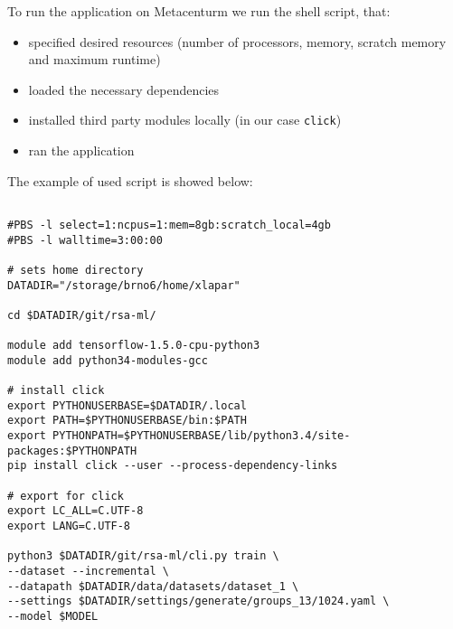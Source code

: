 To run the application on Metacenturm we run the shell script, that:

\begin{itemize}

\item specified desired resources (number of processors, memory, scratch memory and maximum runtime)

\item loaded the necessary dependencies

\item installed third party modules locally (in our case \texttt{click})

\item ran the application

\end{itemize}

\noindent
The example of used script is showed below:

\begin{verbatim}

#PBS -l select=1:ncpus=1:mem=8gb:scratch_local=4gb
#PBS -l walltime=3:00:00

# sets home directory
DATADIR="/storage/brno6/home/xlapar"

cd $DATADIR/git/rsa-ml/

module add tensorflow-1.5.0-cpu-python3
module add python34-modules-gcc

# install click
export PYTHONUSERBASE=$DATADIR/.local
export PATH=$PYTHONUSERBASE/bin:$PATH
export PYTHONPATH=$PYTHONUSERBASE/lib/python3.4/site-packages:$PYTHONPATH
pip install click --user --process-dependency-links

# export for click
export LC_ALL=C.UTF-8
export LANG=C.UTF-8

python3 $DATADIR/git/rsa-ml/cli.py train \
--dataset --incremental \
--datapath $DATADIR/data/datasets/dataset_1 \
--settings $DATADIR/settings/generate/groups_13/1024.yaml \
--model $MODEL

\end{verbatim}









